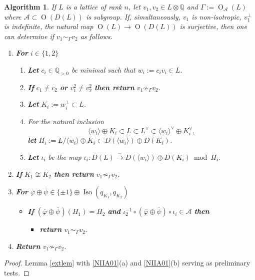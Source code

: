 \documentclass[12pt, a4paper]{article}
\newtheorem{algo}{Algorithm}[section]
\newcommand{\QQ}{\mathbb{Q}}
\newcommand{\la}{\langle}
\newcommand{\ra}{\rangle}
\newcommand{\beq}{\begin{equation*}}
\newcommand{\eeq}{\end{equation*}}
\newcommand{\Ac}{\mathcal{A}}
\newcommand{\opn}{\operatorname}
\newcommand{\op}{\oplus}
\newcommand{\bi}{\begin{itemize}}
\newcommand{\ei}{\end{itemize}}
\begin{document}
\begin{algo}\label{non_iso_indef_alg0}
  If $L$ is a lattice of rank $n$, let $v_1, v_2 \in L \otimes \QQ$ and $\Gamma:=\opn{O}_{\Ac}(L)$ where $\Ac \subset \opn{O}(D(L))$ is subgroup. 
  If, simultaneously, 
$v_1$ is non-isotropic,
  $v_1^{\perp}$ is indefinite, 
  the natural map $\opn{O}(L) \rightarrow \opn{O}(D(L))$ is surjective,
then one can determine if $v_1 \sim_{\Gamma} v_2$ as follows.
  \begin{enumerate}
  \item \textbf{For} $i \in \{1,2\}$ \label{NIIA01}
    \begin{enumerate}
    \item \textbf{Let} $c_i \in \QQ_{>0}$ be minimal such that $w_i:=c_i v_i \in L$.
    \item \textbf{If} $c_1 \neq c_2$ \textbf{or} $v_1^2 \neq v_2^2$ \textbf{then return} $v_1 \not \sim_{\Gamma} v_2$. 
    \item \textbf{Let} $K_i:=w_i^{\perp} \subset L$. 
    \item For the natural inclusion
      \beq
      \la w_i \ra \op K_i
      \subset L
      \subset L^{\vee}
      \subset \la w_i \ra^{\vee} \op K_i^{\vee},
      \eeq
      \textbf{let} $H_i:=L/\la w_i \ra \op K_i \subset D(\la w_i \ra ) \op D(K_i)$. 
    \item \textbf{Let} $\iota_i$ be the map $\iota_i:D(L) \xrightarrow{\sim} D(\la w_i \ra) \op D(K_i) \bmod{H_i}$. 
    \end{enumerate}
  \item \textbf{If} $K_1 \not \cong K_2$ \textbf{then return} $v_1 \not \sim_{\Gamma} v_2$.
  \item \textbf{For} $\overline{\varphi} \op \overline{\psi} \in \{ \pm 1 \} \op \opn{Iso}(q_{K_1}, q_{K_2})$ \label{NIIA02}
    \bi
  \item[] \textbf{If}
    $(\overline{\varphi} \op \overline{\psi})(H_1) = H_2$ \textbf{and} $\iota_2^{-1} \circ (\overline{\varphi} \op \overline{\psi}) \circ \iota_i \in \Ac$ \textbf{then}
    \bi
  \item[] \textbf{return } $v_1 \sim_{\Gamma} v_2$. 
    \ei
    \ei
  \item \textbf{Return} $v_1 \not \sim_{\Gamma} v_2$. \label{NIIA03}
  \end{enumerate}
\end{algo}
\begin{proof}
  Lemma \ref{extlem} with \ref{NIIA01}(a) and \ref{NIIA01}(b) serving as preliminary tests.
\end{proof}
\end{document}
